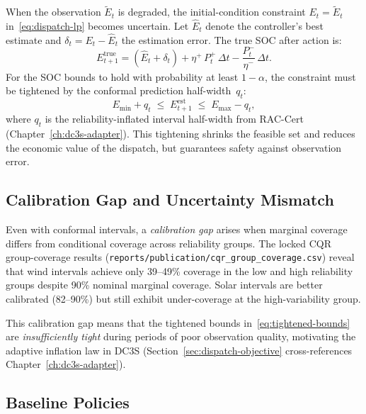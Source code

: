 When the observation $\tilde{E}_t$ is degraded, the initial-condition
constraint $E_t = \tilde{E}_t$ in~\eqref{eq:dispatch-lp} becomes uncertain.
Let $\hat{E}_t$ denote the controller's best estimate and
$\delta_t = E_t - \hat{E}_t$ the estimation error.  The true SOC after action
is:
\begin{equation}
\label{eq:soc-uncertain}
  E_{t+1}^{\mathrm{true}} = (\hat{E}_t + \delta_t)
    + \eta^{+}\,P_t^{+}\,\Delta t - \frac{P_t^{-}}{\eta^{-}}\,\Delta t.
\end{equation}
For the SOC bounds to hold with probability at least $1 - \alpha$, the
constraint must be tightened by the conformal prediction half-width~$q_t$:
\begin{equation}
\label{eq:tightened-bounds}
  E_{\min} + q_t \;\le\; E_{t+1}^{\mathrm{est}} \;\le\; E_{\max} - q_t,
\end{equation}
where $q_t$ is the reliability-inflated interval half-width from RAC-Cert
(Chapter~\ref{ch:dc3s-adapter}).  This tightening shrinks the feasible set
and reduces the economic value of the dispatch, but guarantees safety
against observation error.

\subsection{Calibration Gap and Uncertainty Mismatch}

Even with conformal intervals, a \emph{calibration gap} arises when marginal
coverage differs from conditional coverage across reliability groups.  The
locked CQR group-coverage results
(\texttt{reports/publication/cqr\_group\_coverage.csv}) reveal that wind
intervals achieve only 39--49\% coverage in the low and high reliability
groups despite 90\% nominal marginal coverage.  Solar intervals are better
calibrated (82--90\%) but still exhibit under-coverage at the high-variability
group.

This calibration gap means that the tightened bounds
in~\eqref{eq:tightened-bounds} are \emph{insufficiently tight} during periods
of poor observation quality, motivating the adaptive inflation law in DC3S
(Section~\ref{sec:dispatch-objective} cross-references
Chapter~\ref{ch:dc3s-adapter}).

\subsection{Baseline Policies}

